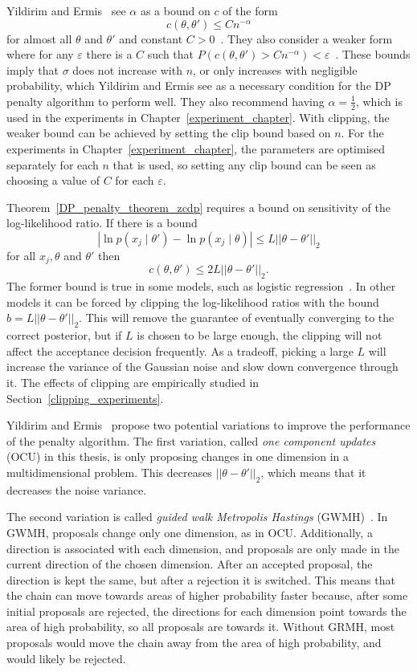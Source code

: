 \documentclass[english,twoside,openright]{HYgraduMLDS}
\begin{document}
Yildirim and Ermis~\cite{YildirimE19} see \(\alpha\) as a bound on \(c\) of the
form
\[
  c(\theta, \theta') \leq Cn^{-\alpha}
\]
for almost all \(\theta\) and \(\theta'\) and constant
\(C > 0\)~\cite[Assumption A1]{YildirimE19}.
They also consider a weaker form where for any \(\varepsilon\) there is
a \(C\) such that
\(P(c(\theta, \theta') > Cn^{-\alpha}) < \varepsilon\)~\cite[Assumption A4]{YildirimE19}.
These bounds imply that \(\sigma\) does not increase with \(n\), or only increases
with negligible probability, which Yildirim and Ermis see as a necessary
condition for the DP penalty algorithm to perform well. They also recommend
having \(\alpha = \frac{1}{2}\), which is used in the experiments in
Chapter~\ref{experiment_chapter}.
With clipping, the weaker bound can be achieved by setting the clip bound based
on \(n\). For the experiments
in Chapter~\ref{experiment_chapter}, the parameters are optimised separately
for each \(n\) that is used, so setting any clip bound can be seen as
choosing a value of \(C\) for each \(\varepsilon\).

Theorem~\ref{DP_penalty_theorem_zcdp}
requires a bound on sensitivity of the log-likelihood ratio. If there is a bound
\[
    |\ln p(x_j\mid \theta') - \ln p(x_j\mid \theta)| \leq L||\theta - \theta'||_2
\]
for all \(x_j, \theta\) and \(\theta'\) then
\[
    c(\theta, \theta') \leq 2L||\theta - \theta'||_2.
\]
The former bound is true in some models, such as logistic
regression~\cite{YildirimE19}. In other
models it can be forced by clipping the log-likelihood ratios with the bound
\(b = L||\theta - \theta'||_{2}\). This will remove the
guarantee of eventually converging to the correct posterior, but if \(L\) is
chosen to be large enough, the clipping will not affect the
acceptance decision frequently. As a tradeoff, picking a large \(L\) will increase
the variance of the Gaussian noise and slow down convergence through it.
The effects of clipping are empirically studied in
Section~\ref{clipping_experiments}.

Yildirim and Ermis~\cite{YildirimE19} propose two potential variations to improve the
performance of the penalty algorithm. The first variation, called
\emph{one component updates} (OCU) in this thesis, is only proposing
changes in one dimension in a multidimensional problem. This decreases
\(||\theta - \theta'||_2\), which means that it decreases the noise variance.

The second variation is called \emph{guided walk Metropolis Hastings}
(GWMH)~\cite{YildirimE19}.
In GWMH, proposals change only one dimension, as in OCU. Additionally, a direction
is associated with each dimension, and proposals are only made in the current
direction of the chosen dimension. After an accepted proposal, the direction is
kept the same, but after a rejection it is switched. This means that the chain can
move towards areas of higher probability faster because, after some initial
proposals are rejected, the directions for each dimension point towards the
area of high probability, so all proposals are towards it. Without GRMH, most
proposals would move the chain away from the area of high probability, and
would likely be rejected.
\end{document}
